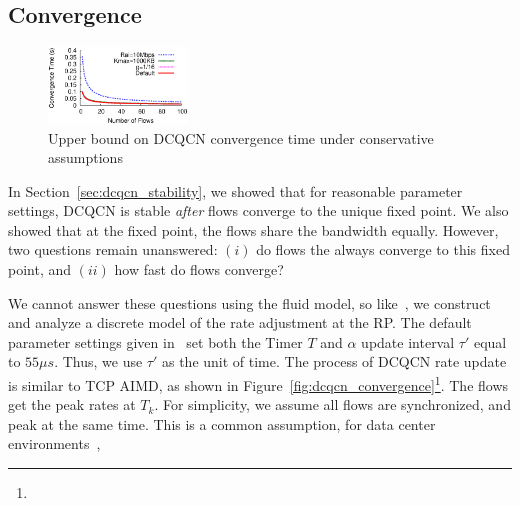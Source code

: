 \vspace{-0.1em}
\subsection{Convergence}
\label{sec:dcqcn_convergence}


\begin{figure}[t]
\centering
\includegraphics[width=0.33\textwidth]{figures/dcqcn_convergence_time.eps}
\vspace{-1em}
\caption{Upper bound on DCQCN convergence time under conservative assumptions}
\vspace{-1em}
\label{fig:dcqcn_convergence_time}
\end{figure}
\fi

In Section~\ref{sec:dcqcn_stability}, we showed that for reasonable parameter
settings,  DCQCN is stable {\em after} flows converge to the unique fixed point.
We also showed that at the fixed point, the flows share the bandwidth equally.
However, two questions remain unanswered: $(i)$ do flows the always converge
to this fixed point, and $(ii)$ how fast do flows converge? 

We cannot answer these questions using the fluid model, so
like~\cite{dctcp-analysis}, we construct and analyze a discrete model of the
rate adjustment at the RP. The default parameter settings given in~\cite{dcqcn}
set both the Timer $T$ and $\alpha$ update interval $\tau '$ equal to $55\mu s$.
Thus, we use $\tau '$ as the unit of time.  The process of DCQCN rate update is
similar to TCP AIMD, as shown in Figure~\ref{fig:dcqcn_convergence}\footnote{}.  The flows
get the peak rates at $T_k$. For simplicity, we assume all flows are
synchronized, and peak at the same time.  This is a common assumption, for data
center environments~\cite{dctcp-analysis}, 

